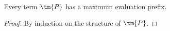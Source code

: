 \begin{lemma}\label{thm:hccp-maximum-evaluation-prefix}
  Every term $\tm{P}$ has a maximum evaluation prefix.
\end{lemma}
\begin{proof}
  By induction on the structure of $\tm{P}$.
\end{proof}
